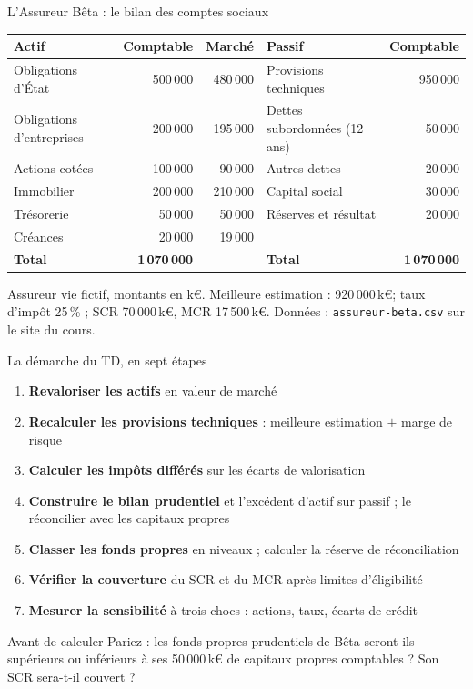 \documentclass[10pt,aspectratio=169]{beamer}
\newcommand{\keur}{\,k\euro}
\begin{document}
\begin{frame}{L'Assureur Bêta : le bilan des comptes sociaux}
\begin{table}
\centering
\small
\begin{tabular}{lrr@{\qquad}lr}
\toprule
\textbf{Actif} & \textbf{Comptable} & \textbf{Marché} & \textbf{Passif} & \textbf{Comptable} \\
\midrule
Obligations d'État        & 500\,000 & 480\,000 & Provisions techniques       & 950\,000 \\
Obligations d'entreprises & 200\,000 & 195\,000 & Dettes subordonnées (12 ans) & 50\,000 \\
Actions cotées            & 100\,000 &  90\,000 & Autres dettes               &  20\,000 \\
Immobilier                & 200\,000 & 210\,000 & Capital social              &  30\,000 \\
Trésorerie                &  50\,000 &  50\,000 & Réserves et résultat        &  20\,000 \\
Créances                  &  20\,000 &  19\,000 &                             &          \\
\midrule
\textbf{Total}            & \textbf{1\,070\,000} & & \textbf{Total} & \textbf{1\,070\,000} \\
\bottomrule
\end{tabular}
\end{table}
\small Assureur vie fictif, montants en k\euro. Meilleure estimation : 920\,000\keur ; taux d'impôt
25\,\% ; SCR 70\,000\keur, MCR 17\,500\keur. Données : \texttt{assureur-beta.csv} sur le site du cours.
\end{frame}

\begin{frame}{La démarche du TD, en sept étapes}
\begin{enumerate}
  \item \textbf{Revaloriser les actifs} en valeur de marché
  \item \textbf{Recalculer les provisions techniques} : meilleure estimation $+$ marge de risque
  \item \textbf{Calculer les impôts différés} sur les écarts de valorisation
  \item \textbf{Construire le bilan prudentiel} et l'excédent d'actif sur passif ; le réconcilier avec les capitaux propres
  \item \textbf{Classer les fonds propres} en niveaux ; calculer la réserve de réconciliation
  \item \textbf{Vérifier la couverture} du SCR et du MCR après limites d'éligibilité
  \item \textbf{Mesurer la sensibilité} à trois chocs : actions, taux, écarts de crédit
\end{enumerate}
\vspace{0.2cm}
\begin{alertblock}{Avant de calculer}
Pariez : les fonds propres prudentiels de Bêta seront-ils supérieurs ou inférieurs à ses
50\,000\keur{} de capitaux propres comptables ? Son SCR sera-t-il couvert ?
\end{alertblock}
\end{frame}
\end{document}
